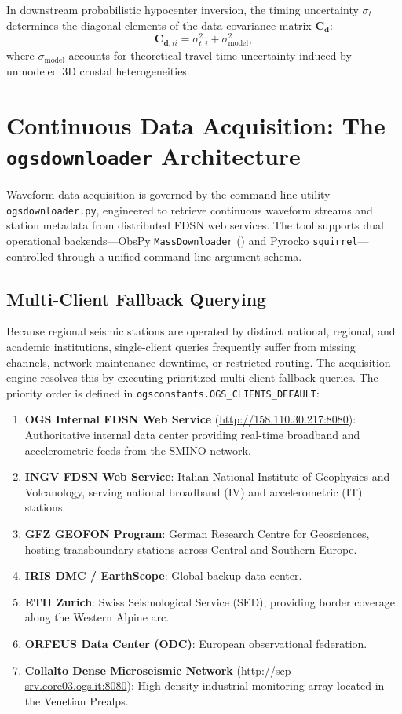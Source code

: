 In downstream probabilistic hypocenter inversion, the timing uncertainty $\sigma_t$ determines the diagonal elements of the data covariance matrix $\mathbf{C}_{\mathbf{d}}$:
\begin{equation}
  \mathbf{C}_{\mathbf{d}, ii} = \sigma_{t, i}^2 + \sigma_{\mathrm{model}}^2,
  \label{eq:data_covariance}
\end{equation}
where $\sigma_{\mathrm{model}}$ accounts for theoretical travel-time uncertainty induced by unmodeled 3D crustal heterogeneities.

\section{Continuous Data Acquisition: The \texttt{ogsdownloader} Architecture}
\label{sec:data_acquisition}

Waveform data acquisition is governed by the command-line utility \texttt{ogsdownloader.py}, engineered to retrieve continuous waveform streams and station metadata from distributed \acf{FDSN} web services. The tool supports dual operational backends—ObsPy \texttt{MassDownloader} (\cite{ObsPy}) and Pyrocko \texttt{squirrel}—controlled through a unified command-line argument schema.

\subsection{Multi-Client Fallback Querying}
\label{subsec:multi_client_fallback}

Because regional seismic stations are operated by distinct national, regional, and academic institutions, single-client queries frequently suffer from missing channels, network maintenance downtime, or restricted routing. The acquisition engine resolves this by executing prioritized multi-client fallback queries. The priority order is defined in \texttt{ogsconstants.OGS\_CLIENTS\_DEFAULT}:
\begin{enumerate}
  \item \textbf{OGS Internal FDSN Web Service} (\url{http://158.110.30.217:8080}): Authoritative internal data center providing real-time broadband and accelerometric feeds from the SMINO network.
  \item \textbf{INGV FDSN Web Service}: Italian National Institute of Geophysics and Volcanology, serving national broadband (IV) and accelerometric (IT) stations.
  \item \textbf{GFZ GEOFON Program}: German Research Centre for Geosciences, hosting transboundary stations across Central and Southern Europe.
  \item \textbf{IRIS DMC / EarthScope}: Global backup data center.
  \item \textbf{ETH Zurich}: Swiss Seismological Service (SED), providing border coverage along the Western Alpine arc.
  \item \textbf{ORFEUS Data Center (ODC)}: European observational federation.
  \item \textbf{Collalto Dense Microseismic Network} (\url{http://scp-srv.core03.ogs.it:8080}): High-density industrial monitoring array located in the Venetian Prealps.
\end{enumerate}

